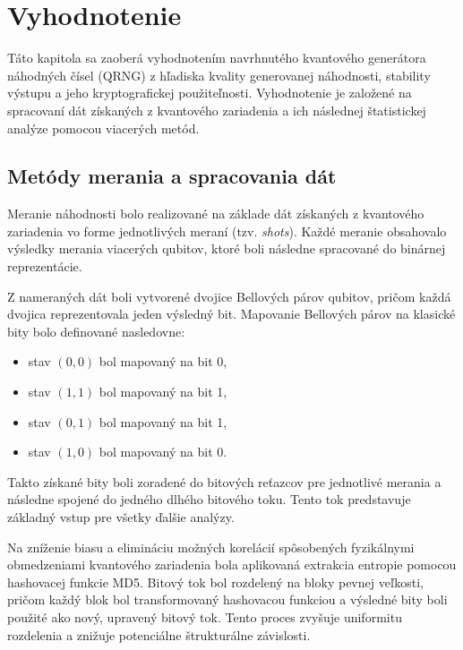 \chapter{Vyhodnotenie}\label{ch:evaluation}


Táto kapitola sa zaoberá vyhodnotením navrhnutého kvantového generátora náhodných čísel (QRNG) z hľadiska kvality generovanej náhodnosti, stability výstupu a jeho kryptografickej použiteľnosti. Vyhodnotenie je založené na spracovaní dát získaných z kvantového zariadenia a ich následnej štatistickej analýze pomocou viacerých metód.


\section{Metódy merania a spracovania dát}


Meranie náhodnosti bolo realizované na základe dát získaných z kvantového zariadenia vo forme jednotlivých meraní (tzv. \textit{shots}).
Každé meranie obsahovalo výsledky merania viacerých qubitov, ktoré boli následne spracované do binárnej reprezentácie.


Z nameraných dát boli vytvorené dvojice Bellových párov qubitov, pričom každá dvojica reprezentovala jeden výsledný bit.
Mapovanie Bellových párov na klasické bity bolo definované nasledovne:


\begin{itemize}

  \item stav $(0,0)$ bol mapovaný na bit 0,

  \item stav $(1,1)$ bol mapovaný na bit 1,

  \item stav $(0,1)$ bol mapovaný na bit 1,

  \item stav $(1,0)$ bol mapovaný na bit 0.

\end{itemize}


Takto získané bity boli zoradené do bitových reťazcov pre jednotlivé merania a následne spojené do jedného dlhého bitového toku. Tento tok predstavuje základný vstup pre všetky ďalšie analýzy.


Na zníženie biasu a elimináciu možných korelácií spôsobených fyzikálnymi obmedzeniami kvantového zariadenia bola aplikovaná extrakcia entropie pomocou hashovacej funkcie MD5. Bitový tok bol rozdelený na bloky pevnej veľkosti, pričom každý blok bol transformovaný hashovacou funkciou a výsledné bity boli použité ako nový, upravený bitový tok. Tento proces zvyšuje uniformitu rozdelenia a znižuje potenciálne štrukturálne závislosti.


